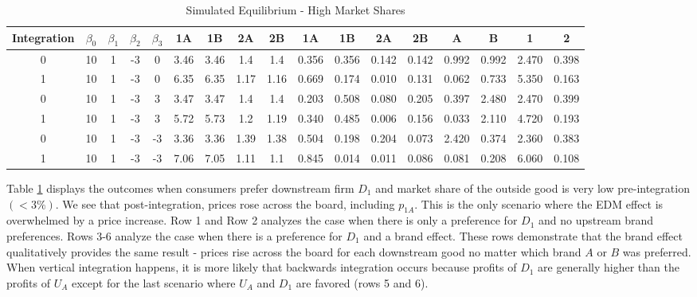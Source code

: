 \documentclass[12pt]{article}%
\begin{document}
\begin{table}[h]
{\begin{tabular}{c|cccc|cccc|cccc|cccc}
    \midrule
    \multicolumn{1}{c|}{Integration} & \multicolumn{1}{c}{$\beta_0$} & \multicolumn{1}{c}{$\beta_1$} & \multicolumn{1}{c}{$\beta_2$} & \multicolumn{1}{c|}{$\beta_3$} & \multicolumn{1}{c}{1A} & \multicolumn{1}{c}{1B} & \multicolumn{1}{c}{2A} & \multicolumn{1}{c|}{2B} & \multicolumn{1}{c}{1A} & \multicolumn{1}{c}{1B} & \multicolumn{1}{c}{2A} & \multicolumn{1}{c|}{2B} & \multicolumn{1}{c}{A} & \multicolumn{1}{c}{B} & \multicolumn{1}{c}{1} & \multicolumn{1}{c}{2} \\
    \midrule
    \midrule
  0     & 10    & 1     & -3    & 0     & 3.46  & 3.46  & 1.4   & 1.4   & 0.356 & 0.356 & 0.142 & 0.142 & 0.992 & 0.992 & 2.470 & 0.398 \\
    1     & 10    & 1     & -3    & 0     & 6.35  & 6.35  & 1.17  & 1.16  & 0.669 & 0.174 & 0.010 & 0.131 & 0.062 & 0.733 & 5.350 & 0.163 \\
    0     & 10    & 1     & -3    & 3     & 3.47  & 3.47  & 1.4   & 1.4   & 0.203 & 0.508 & 0.080 & 0.205 & 0.397 & 2.480 & 2.470 & 0.399 \\
    1     & 10    & 1     & -3    & 3     & 5.72  & 5.73  & 1.2   & 1.19  & 0.340 & 0.485 & 0.006 & 0.156 & 0.033 & 2.110 & 4.720 & 0.193 \\
    0     & 10    & 1     & -3    & -3    & 3.36  & 3.36  & 1.39  & 1.38  & 0.504 & 0.198 & 0.204 & 0.073 & 2.420 & 0.374 & 2.360 & 0.383 \\
    1     & 10    & 1     & -3    & -3    & 7.06  & 7.05  & 1.11  & 1.1   & 0.845 & 0.014 & 0.011 & 0.086 & 0.081 & 0.208 & 6.060 & 0.108 \\
    \end{tabular}%
    }
    \caption{Simulated Equilibrium - High Market Shares}
  \label{tab:high market share}%
\end{table}%

Table \ref{tab:high market share} displays the outcomes when consumers prefer downstream firm $D_1$ and market share of the outside good is very low pre-integration $(< 3\%)$.  We see that post-integration, prices rose across the board, including $p_{1A}$. This is the only scenario where the EDM effect is overwhelmed by a price increase. Row 1 and Row 2 analyzes the case when there is only a preference for $D_1$ and no upstream brand preferences. Rows 3-6 analyze the case when there is a preference for $D_1$ and a brand effect. These rows demonstrate that the brand effect qualitatively provides the same result - prices rise across the board for each downstream good no matter which brand $A$ or $B$ was preferred. When vertical integration happens, it is more likely that backwards integration occurs because profits of $D_1$ are generally higher than the profits of $U_A$ except for the last scenario where $U_A$ and $D_1$ are favored (rows 5 and 6).
\end{document}
